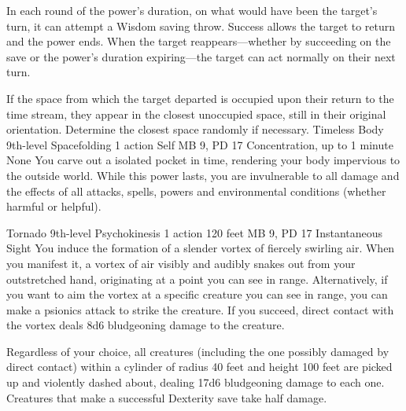 In each round of the power's duration, on what would have
been the target's turn, it can attempt a Wisdom saving throw.
Success allows the target to return and the power ends. When
the target reappears---whether by succeeding on the save or
the power's duration expiring---the target can act normally
on their next turn.

If the space from which the target departed is occupied upon
their return to the time stream, they appear in the closest
unoccupied space, still in their original orientation. Determine
the closest space randomly if necessary.
\DndPowerHeader%
    {Timeless Body\label{pwr:timeless-body}}
    {9th-level Spacefolding}
    {1 action}
    {Self}
    {MB 9, PD 17}
    {Concentration, up to 1 minute}
    {None}
You carve out a isolated pocket in time,
rendering your body impervious to the outside world. While
this power lasts, you are invulnerable to all damage and the
effects of all attacks, spells, powers and environmental conditions
(whether harmful or helpful).

\DndPowerHeader%
    {Tornado\label{pwr:tornado}}
    {9th-level Psychokinesis}
    {1 action}
    {120 feet}
    {MB 9, PD 17}
    {Instantaneous}
    {Sight}
You induce the formation of a slender vortex
of fiercely swirling air. When you manifest it, a vortex of
air visibly and audibly snakes out from your outstretched
hand, originating at a point you can see in range.
Alternatively,
if you want to aim the vortex at a specific creature you can
see in range, you can make a psionics attack to strike the
creature. If you succeed, direct contact with the vortex deals
8d6 bludgeoning damage to the creature.

Regardless of your choice,
all creatures (including the one possibly damaged
by direct contact) within a cylinder of radius
40 feet and height 100 feet are picked up and violently dashed
about, dealing 17d6 bludgeoning damage to each one. Creatures
that make a successful Dexterity save take half damage.

